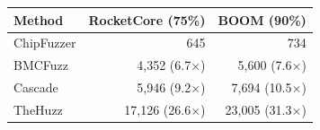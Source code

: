 \begin{tabular}{@{}l r r@{}}\toprule
Method & RocketCore (75\%) & BOOM (90\%)\\\midrule
ChipFuzzer & 645 & 734\\
BMCFuzz & 4,352 (6.7$\times$) & 5,600 (7.6$\times$)\\
Cascade & 5,946 (9.2$\times$) & 7,694 (10.5$\times$)\\
TheHuzz & 17,126 (26.6$\times$) & 23,005 (31.3$\times$)\\
\bottomrule\end{tabular}